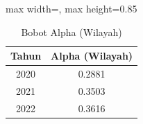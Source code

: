 \begin{table}[H]
\centering
\caption{Bobot Alpha (Wilayah)} \label{tab:samplealpha_w}
\begin{adjustbox}{max width=\textwidth, max height=0.85\textheight}
\begin{tabular}{|c|c|}
\hline
\textbf{Tahun} & \textbf{Alpha (Wilayah)} \\
\hline
2020 & 0.2881 \\
2021 & 0.3503 \\
2022 & 0.3616 \\
\hline
\end{tabular}
\end{adjustbox}
\end{table}